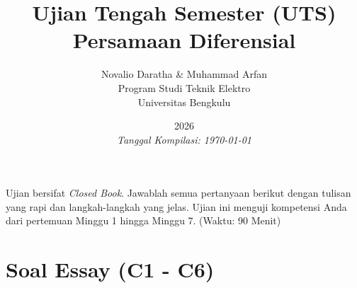 \documentclass[11pt,a4paper]{article}
\title{\vspace{-2cm}\textbf{Ujian Tengah Semester (UTS)\\Persamaan Diferensial}}
\author{Novalio Daratha \& Muhammad Arfan\\Program Studi Teknik Elektro\\Universitas Bengkulu}
\date{2026 \\ \vspace{2mm}\small\textit{Tanggal Kompilasi: \today}}
\begin{document}
\maketitle

\begin{tcolorbox}[colback=blue!5!white,colframe=blue!75!black,title=Instruksi UTS]
Ujian bersifat \textit{Closed Book}. Jawablah semua pertanyaan berikut dengan tulisan yang rapi dan langkah-langkah yang jelas. Ujian ini menguji kompetensi Anda dari pertemuan Minggu 1 hingga Minggu 7. (Waktu: 90 Menit)
\end{tcolorbox}

\section*{Soal Essay (C1 - C6)}
\end{document}
